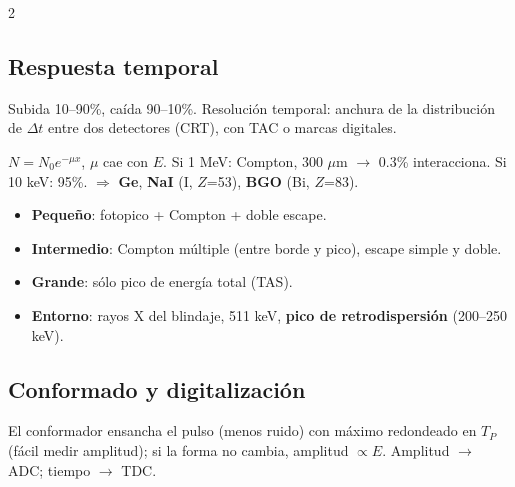 \documentclass[10pt,a4paper]{article}
\begin{document}
\begin{multicols}{2}
\subsection{Respuesta temporal}
Subida 10--90\%, caída 90--10\%. Resolución temporal: anchura de la distribución de $\Delta t$ entre dos detectores (CRT), con TAC o marcas digitales.
\begin{clave}
$N=N_0e^{-\mu x}$, $\mu$ cae con $E$. Si 1 MeV: Compton, 300 $\mu$m $\to$ 0.3\% interacciona. Si 10 keV: 95\%.
$\Rightarrow$ \textbf{Ge}, \textbf{NaI} (I, $Z$=53), \textbf{BGO} (Bi, $Z$=83).
\begin{itemize}
\item \textbf{Pequeño}: fotopico + Compton + doble escape.
\item \textbf{Intermedio}: Compton múltiple (entre borde y pico), escape simple y doble.
\item \textbf{Grande}: sólo pico de energía total (TAS).
\item \textbf{Entorno}: rayos X del blindaje, 511 keV, \textbf{pico de retrodispersión} (200--250 keV).
\end{itemize}
\end{clave}
\subsection{Conformado y digitalización}
El conformador ensancha el pulso (menos ruido) con máximo redondeado en $T_P$ (fácil medir amplitud); si la forma no cambia, amplitud $\propto E$.
Amplitud $\to$ ADC; tiempo $\to$ TDC.
\end{multicols}
\newpage

\end{document}
